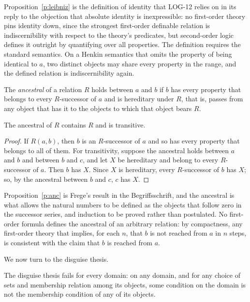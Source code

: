 \documentclass{situationist-preprint}
\begin{document}
Proposition~\ref{p:leibniz} is the definition of identity that LOG-12 relies on in its reply to the objection that absolute identity is inexpressible: no first-order theory pins identity down, since the strongest first-order definable relation is indiscernibility with respect to the theory's predicates, but second-order logic defines it outright by quantifying over all properties. The definition requires the standard semantics. On a Henkin semantics that omits the property of being identical to $a$, two distinct objects may share every property in the range, and the defined relation is indiscernibility again.

\begin{definition}[Frege]\label{d:anc}
The \emph{ancestral} of a relation $R$ holds between $a$ and $b$ if $b$ has every property that belongs to every $R$-successor of $a$ and is hereditary under $R$, that is, passes from any object that has it to the objects to which that object bears $R$.
\end{definition}

\begin{proposition}\label{p:anc}
The ancestral of $R$ contains $R$ and is transitive.
\end{proposition}

\begin{proof}
If $R(a, b)$, then $b$ is an $R$-successor of $a$ and so has every property that belongs to all of them. For transitivity, suppose the ancestral holds between $a$ and $b$ and between $b$ and $c$, and let $X$ be hereditary and belong to every $R$-successor of $a$. Then $b$ has $X$. Since $X$ is hereditary, every $R$-successor of $b$ has $X$; so, by the ancestral between $b$ and $c$, $c$ has $X$.
\end{proof}

Proposition~\ref{p:anc} is Frege's result in the Begriffsschrift, and the ancestral is what allows the natural numbers to be defined as the objects that follow zero in the successor series, and induction to be proved rather than postulated. No first-order formula defines the ancestral of an arbitrary relation: by compactness, any first-order theory that implies, for each $n$, that $b$ is not reached from $a$ in $n$ steps, is consistent with the claim that $b$ is reached from $a$.

We now turn to the disguise thesis.

\begin{theorem}\label{t:nodisguise}
The disguise thesis fails for every domain: on any domain, and for any choice of sets and membership relation among its objects, some condition on the domain is not the membership condition of any of its objects.
\end{theorem}
\end{document}
